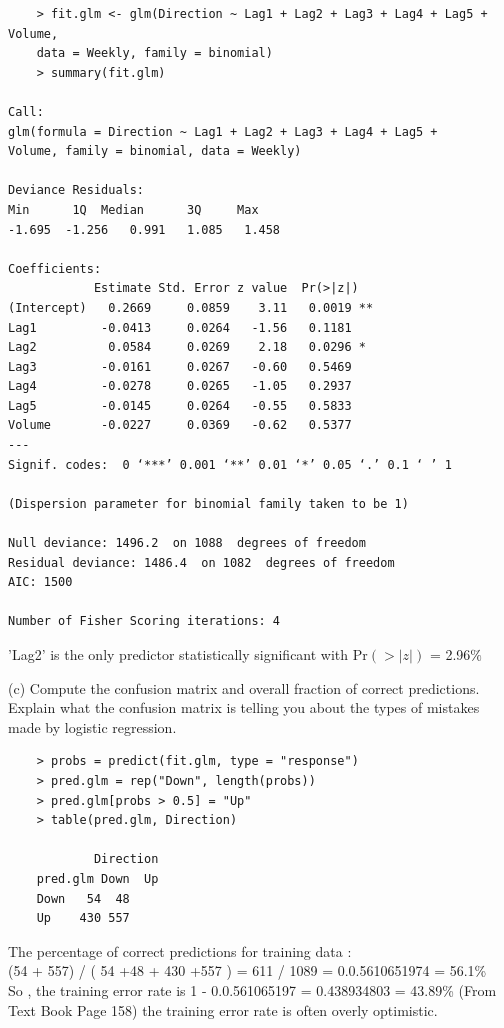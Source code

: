 \documentclass{article}
\begin{document}
\begin{program}
	\begin{verbatim}
	> fit.glm <- glm(Direction ~ Lag1 + Lag2 + Lag3 + Lag4 + Lag5 + Volume, 
	data = Weekly, family = binomial)
	> summary(fit.glm)

Call:
glm(formula = Direction ~ Lag1 + Lag2 + Lag3 + Lag4 + Lag5 + 
Volume, family = binomial, data = Weekly)

Deviance Residuals: 
Min      1Q  Median      3Q     Max  
-1.695  -1.256   0.991   1.085   1.458  

Coefficients:
            Estimate Std. Error z value  Pr(>|z|)   
(Intercept)   0.2669     0.0859    3.11   0.0019 **
Lag1         -0.0413     0.0264   -1.56   0.1181   
Lag2          0.0584     0.0269    2.18   0.0296 * 
Lag3         -0.0161     0.0267   -0.60   0.5469   
Lag4         -0.0278     0.0265   -1.05   0.2937   
Lag5         -0.0145     0.0264   -0.55   0.5833   
Volume       -0.0227     0.0369   -0.62   0.5377   
---
Signif. codes:  0 ‘***’ 0.001 ‘**’ 0.01 ‘*’ 0.05 ‘.’ 0.1 ‘ ’ 1

(Dispersion parameter for binomial family taken to be 1)

Null deviance: 1496.2  on 1088  degrees of freedom
Residual deviance: 1486.4  on 1082  degrees of freedom
AIC: 1500

Number of Fisher Scoring iterations: 4
	\end{verbatim}
\end{program}

'Lag2' is the only predictor statistically significant  with Pr$(>|z|)$ = 2.96$\%$
\newpage

(c) Compute the confusion matrix and overall fraction of correct predictions. Explain what the confusion matrix is telling you about the types of mistakes made by logistic regression.

\begin{program}
	\begin{verbatim}
	> probs = predict(fit.glm, type = "response")
	> pred.glm = rep("Down", length(probs))
	> pred.glm[probs > 0.5] = "Up"
	> table(pred.glm, Direction)
	
	        Direction
	pred.glm Down  Up
	Down   54  48
	Up    430 557
	\end{verbatim}
\end{program}

The percentage of correct predictions for training data : \\
(54 + 557) / ( 54 +48 + 430 +557 ) = 611 / 1089 = 0.0.5610651974 = 56.1\% \\
So , the training error rate is 1 - 0.0.561065197 = 0.438934803 = 43.89\%  (From  Text Book Page 158)  the training error rate is often overly optimistic.\\
\end{document}
